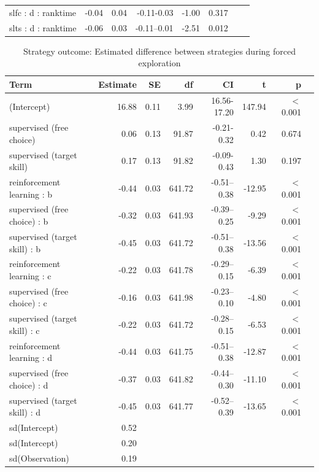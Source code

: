 \documentclass[pdflatex,sn-nature]{sn-jnl}%
\theoremstyle{thmstyleone}%
\theoremstyle{thmstyletwo}%
\theoremstyle{thmstylethree}%
\begin{document}
\begin{appendices}
\begin{table}[p]
\begin{tabular}{llrrrrrr}
slfc : d : ranktime & -0.04 & 0.04 & -0.11-0.03 & -1.00 &    0.317 \\ 
slts : d : ranktime & -0.06 & 0.03 & -0.11--0.01 & -2.51 &    0.012 \\ 
   \hline
\end{tabular}
\end{table}



\begin{table}[p]
\caption{Strategy outcome: Estimated difference between strategies during forced exploration}\label{table_strategyoutcome_diffstrategy}
\centering
\begin{tabular}{lrrrrrrr}
  \hline
Term & Estimate & SE & df & CI & t & p \\ 
  \hline
 (Intercept) & 16.88 & 0.11 & 3.99 & 16.56-17.20 & 147.94 &  $<$  0.001 \\ 
  supervised (free choice) & 0.06 & 0.13 & 91.87 & -0.21-0.32 & 0.42 &    0.674 \\ 
   supervised (target skill) & 0.17 & 0.13 & 91.82 & -0.09-0.43 & 1.30 &    0.197 \\ 
   reinforcement learning : b & -0.44 & 0.03 & 641.72 & -0.51--0.38 & -12.95 &  $<$  0.001 \\ 
  supervised (free choice) : b & -0.32 & 0.03 & 641.93 & -0.39--0.25 & -9.29 &  $<$  0.001 \\ 
   supervised (target skill) : b & -0.45 & 0.03 & 641.72 & -0.51--0.38 & -13.56 &  $<$  0.001 \\ 
  reinforcement learning : c & -0.22 & 0.03 & 641.78 & -0.29--0.15 & -6.39 &  $<$  0.001 \\ 
  supervised (free choice) : c & -0.16 & 0.03 & 641.98 & -0.23--0.10 & -4.80 &  $<$  0.001 \\ 
  supervised (target skill) : c & -0.22 & 0.03 & 641.72 & -0.28--0.15 & -6.53 &  $<$  0.001 \\ 
  reinforcement learning : d & -0.44 & 0.03 & 641.75 & -0.51--0.38 & -12.87 &  $<$  0.001 \\ 
  supervised (free choice) : d & -0.37 & 0.03 & 641.82 & -0.44--0.30 & -11.10 &  $<$  0.001 \\ 
  supervised (target skill) : d & -0.45 & 0.03 & 641.77 & -0.52--0.39 & -13.65 &  $<$  0.001 \\ 
  sd(Intercept) & 0.52 &  &  &  &  &  \\ 
  sd(Intercept) & 0.20 &  &  &  &  &   \\ 
  sd(Observation) & 0.19 &  &  &  &  &   \\ 
   \hline
\end{tabular}
\end{table}





\end{appendices}
\end{document}
